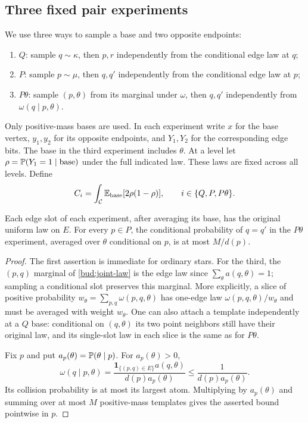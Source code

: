 \subsection{Three fixed pair experiments}

We use three ways to sample a base and two opposite endpoints:
\begin{enumerate}[label=(\roman*)]
 \item $Q$: sample $q\sim\kappa$, then $p,r$ independently from the
 conditional edge law at $q$;
 \item $P$: sample $p\sim\mu$, then $q,q'$ independently from the
 conditional edge law at $p$;
 \item $P\theta$: sample $(p,\theta)$ from its marginal under
 $\omega$, then $q,q'$ independently from $\omega(q\mid p,\theta)$.
\end{enumerate}
Only positive-mass bases are used.  In each experiment write $x$ for
the base vertex, $y_1,y_2$ for its opposite endpoints, and $Y_1,Y_2$
for the corresponding edge bits.  The base in the third experiment
includes $\theta$.  At a level let
$\rho=\mathbb P(Y_1=1\mid\text{base})$ under the full indicated law.
These laws are fixed across all levels.  Define
\begin{equation}\label{bud:variations}
 C_i=\int_{\mathcal C}\mathbb E_{\mathrm{base}}[2\rho(1-\rho)],
 \qquad i\in\{Q,P,P\theta\}.
\end{equation}

\begin{lemma}\label{bud:pair-laws}
Each edge slot of each experiment, after averaging its base, has the
original uniform law on $E$.  For every $p\in P$, the conditional
probability of $q=q'$ in the $P\theta$ experiment, averaged over
$\theta$ conditional on $p$, is at most $M/d(p)$.
\end{lemma}

\begin{proof}
The first assertion is immediate for ordinary stars.  For the third,
the $(p,q)$ marginal of \eqref{bud:joint-law} is the edge law since
$\sum_\theta a(q,\theta)=1$; sampling a conditional slot preserves
this marginal.  More explicitly, a slice of positive probability
$w_\theta=\sum_{p,q}\omega(p,q,\theta)$ has one-edge law
$\omega(p,q,\theta)/w_\theta$ and must be averaged with weight
$w_\theta$.  One can also attach a template independently at a
$Q$ base: conditional on $(q,\theta)$ its two point neighbors still
have their original law, and its single-slot law in each slice is
the same as for $P\theta$.

Fix $p$ and put $a_p(\theta)=\mathbb P(\theta\mid p)$.  For
$a_p(\theta)>0$,
\[
 \omega(q\mid p,\theta)
 =\frac{\mathbf1_{\{(p,q)\in E\}}a(q,\theta)}{d(p)a_p(\theta)}
 \le\frac1{d(p)a_p(\theta)}.
\]
Its collision probability is at most its largest atom.  Multiplying
by $a_p(\theta)$ and summing over at most $M$ positive-mass templates
gives the asserted bound pointwise in $p$.
\end{proof}


